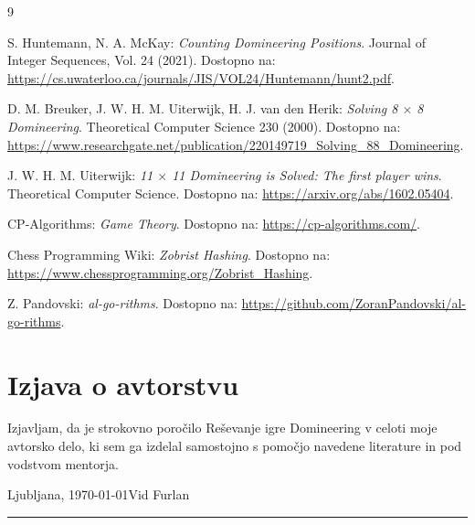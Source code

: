 \documentclass[12pt]{report}
\begin{document}
\begin{thebibliography}{9}

S. Huntemann, N. A. McKay: \emph{Counting Domineering Positions}.  
Journal of Integer Sequences, Vol. 24 (2021).  
Dostopno na: \url{https://cs.uwaterloo.ca/journals/JIS/VOL24/Huntemann/hunt2.pdf}.

D. M. Breuker, J. W. H. M. Uiterwijk, H. J. van den Herik: \emph{Solving 8 $\times$ 8 Domineering}.  
Theoretical Computer Science 230 (2000).  
Dostopno na: \url{https://www.researchgate.net/publication/220149719_Solving_88_Domineering}.

J. W. H. M. Uiterwijk: \emph{11 $\times$ 11 Domineering is Solved: The first player wins}.  
Theoretical Computer Science.  
Dostopno na: \url{https://arxiv.org/abs/1602.05404}.

CP-Algorithms: \emph{Game Theory}.  
Dostopno na: \url{https://cp-algorithms.com/}.

Chess Programming Wiki: \emph{Zobrist Hashing}.  
Dostopno na: \url{https://www.chessprogramming.org/Zobrist_Hashing}.

Z. Pandovski: \emph{al-go-rithms}.  
Dostopno na: \url{https://github.com/ZoranPandovski/al-go-rithms}.

\end{thebibliography}

\chapter*{Izjava o avtorstvu}

Izjavljam, da je strokovno poročilo Reševanje igre Domineering v celoti moje avtorsko delo, ki sem ga izdelal samostojno s pomočjo navedene literature in pod vodstvom mentorja.

\vspace{2cm}

\noindent
Ljubljana, \today \hfill Vid Furlan

\vspace{2cm}

\hfill\rule{6cm}{0.4pt}
\end{document}
